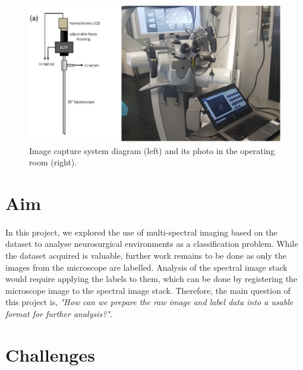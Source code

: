 \documentclass[12pt,oneside]{report}
\begin{document}
\begin{figure}[h]
\centering
\begin{minipage}[h]{0.7\textwidth}
    \centering
    \includegraphics[width=\textwidth]{figures/camera-system.png}
    \caption{Image capture system diagram (left) and its photo in the operating room (right).}
    \label{fig:camera-system}
\end{minipage}
\end{figure}


\section{Aim}

\paragraph{}
In this project, we explored the use of multi-spectral imaging based on the dataset to analyse neurosurgical environments as a classification problem. While the dataset acquired is valuable, further work remains to be done as only the images from the microscope are labelled. Analysis of the spectral image stack would require applying the labels to them, which can be done by registering the microscope image to the spectral image stack. Therefore, the main question of this project is, \textit{"How can we prepare the raw image and label data into a usable format for further analysis?"}.


\section{Challenges}
\end{document}
